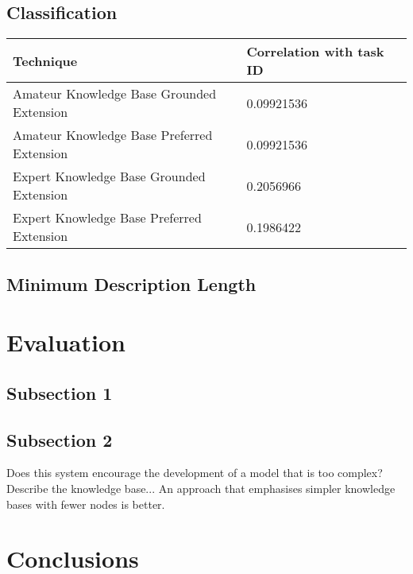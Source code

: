\subsection{Classification}


\begin{center}
    \begin{tabular}{ | l | l | l |}
    \hline
    Technique & Correlation with task ID \\ \hline
    Amateur Knowledge Base Grounded Extension & 0.09921536\\ \hline
    Amateur Knowledge Base Preferred Extension & 0.09921536\\ \hline
    Expert Knowledge Base Grounded Extension & 0.2056966\\ \hline
    Expert Knowledge Base Preferred Extension & 0.1986422\\ \hline
    \end{tabular}
\end{center}

\subsection{Minimum Description Length}




\section{Evaluation}


\subsection{Subsection 1}


\subsection{Subsection 2}

Does this system encourage the development of a model that is too complex? Describe the knowledge base... An approach that emphasises simpler knowledge bases with fewer nodes is better.

\section{Conclusions}

